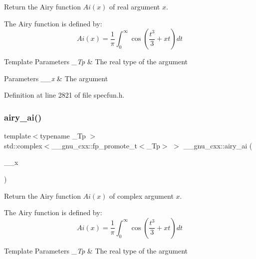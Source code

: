 Return the Airy function $ Ai(x) $ of real argument $ x $.

The Airy function is defined by\+: \[ Ai(x) = \frac{1}{\pi}\int_0^\infty \cos \left(\frac{t^3}{3} + xt \right)dt \]


\begin{DoxyTemplParams}{Template Parameters}
{\em \+\_\+\+Tp} & The real type of the argument \\
\hline
\end{DoxyTemplParams}

\begin{DoxyParams}{Parameters}
{\em \+\_\+\+\_\+x} & The argument \\
\hline
\end{DoxyParams}


Definition at line 2821 of file specfun.\+h.

\mbox{\label{group__gnu__math__spec__func_gacf37e6c9f186ade270b476c8e5826fb9}} 
\subsubsection{\texorpdfstring{airy\+\_\+ai()}{airy\_ai()}\hspace{0.1cm}{\footnotesize\ttfamily [2/2]}}
{\footnotesize\ttfamily template$<$typename \+\_\+\+Tp $>$ \\
std\+::complex$<$\+\_\+\+\_\+gnu\+\_\+cxx\+::fp\+\_\+promote\+\_\+t$<$\+\_\+\+Tp$>$ $>$ \+\_\+\+\_\+gnu\+\_\+cxx\+::airy\+\_\+ai (\begin{DoxyParamCaption}\item[{std\+::complex$<$ \+\_\+\+Tp $>$}]{\+\_\+\+\_\+x }\end{DoxyParamCaption})\hspace{0.3cm}{\ttfamily [inline]}}

Return the Airy function $ Ai(x) $ of complex argument $ x $.

The Airy function is defined by\+: \[ Ai(x) = \frac{1}{\pi}\int_0^\infty \cos \left(\frac{t^3}{3} + xt \right)dt \]


\begin{DoxyTemplParams}{Template Parameters}
{\em \+\_\+\+Tp} & The real type of the argument \\
\hline
\end{DoxyTemplParams}

